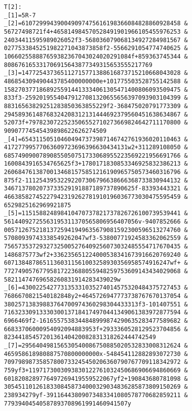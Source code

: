 \begin{verbatim}
T[2]: 
_[1]=5R-7 
_[2]=610729994390049097475616198366084828860928458 &
56727498721f4+465814984570528491901966105455976253 &
24034411595989026052f3-568036079068134927284981567 &
0277533845251982271043873858f2-5566291054774740625 &
106602558887659382367043024020291084f+859363745344 &
808676165331706915643877349315653555217769 
_[3]=147725437365112715771388616873715210668043028 &
486854309490443785400000000e+101775503528755142588 &
15827037718689255914413334061305471400806093509475 &
833f3-25920195540479127081320655656397093903104399 &
88316563829251283850363855229f2-368475020791773309 &
29458936148768324208312131444692379560451638634867 &
52073f+7978230722523506552710273669824642711170800 &
90907774545439898622626274509 
_[4]=654311505104604947373987146742761936020110463 &
41727799577063609723696396630434131w2+311289108050 &
68574909007890855050751733068955223569221956691766 &
1600843916534765625f3+1780171830853346925832386213 &
26068476138700134681575851216190965750573460316796 &
875f2-11125439532292207306796638666368733830944132 &
3467137802073733529191887189737890625f-83393443321 &
46638582745227942319262781910196036773030475595459 &
6529825162969921875 
_[5]=115158824898410470737821737826726100739539441 &
56144092725563195311370565806956407056v-9407852666 &
00571267521813725941949635679081592300596513274760 &
57080939743338549262047wf3-53800771924583362062559 &
75657353729327325005276409256073032485554717670435 &
1486875773wf2+336235651224000538341673916620769240 &
60713848786511360311561003258930356958574916247wf+ &
77274905767795817223688055948259753609143434029068 &
58211474769658260831914283439029w 
_[6]=430022542773135331035274014575320484375727453 &
7686670821540182848y2+4645726947773738767670137054 &
38025713839883764700974360298304433313f3-101407551 &
71632330913330300137184174970441349061383972877594 &
6966469f2-1616557538344848999874290635283477589682 &
66833706000954092094883953f+2933360528129523704856 &
8234418545720136140420082831318262444742549 
_[7]=295640498156530540086750885020532833008312624 &
465958618980887570800000000x-548454112882893072730 &
70979898735857800733245450206360790767709118342972 &
759yf3+1197173003093830122761032450686906694860669 &
6018208289776497269419559522067yf2+190843680781098 &
30545110126183308458734000329034836285873809150269 &
238934279yf-39116443809073483341080578770682859211 &
77939404540587893708961991460941507y 
\end{verbatim}
